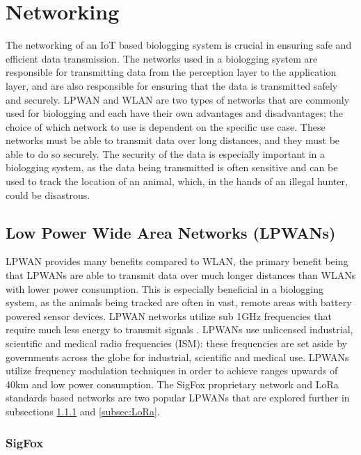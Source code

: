 \documentclass[sigplan,screen,nonacm]{acmart}
\begin{document}
\section{Networking}
\label{sec:Networking}

The networking of an IoT based biologging system is crucial in ensuring safe and
efficient data transmission. The networks used in a biologging system
are responsible for transmitting data from the perception layer to the application
layer, and are also responsible for ensuring that the data is transmitted
safely and securely. LPWAN and WLAN are two types of networks that are commonly used for 
biologging and each have their own advantages and disadvantages; the choice of which 
network to use is dependent on the specific use case. These networks must be able to transmit data over 
long distances, and they must be able to do so securely. The security 
of the data is especially important in a biologging system, as the data being 
transmitted is often sensitive and can be used to track the location of an animal, 
which, in the hands of an illegal hunter, could be disastrous.

\subsection{Low Power Wide Area Networks (LPWANs)}
\label{subsec:Low Power Wide Area Networks (LPWANs)}

LPWAN provides many benefits compared to WLAN, 
the primary benefit being that LPWANs are able to transmit data over much 
longer distances than WLANs with lower power consumption. This is especially beneficial 
in a biologging system, as the animals being tracked are often in vast, remote areas with battery powered sensor devices. 
LPWAN networks utilize sub 1GHz frequencies that require much less energy to transmit signals \cite{yousuf2018throughput}. LPWANs use 
unlicensed industrial, scientific and medical radio frequencies (ISM): these frequencies 
are set aside by governments across the globe for industrial, scientific and medical use. 
LPWANs utilize frequency modulation techniques in order to achieve ranges upwards of 40km and 
low power consumption. The SigFox proprietary network and LoRa standards based networks are 
two popular LPWANs that are explored further in subsections \ref{subsec:SigFox} and 
\ref{subsec:LoRa}.

\subsubsection{SigFox}
\label{subsec:SigFox}
\end{document}
